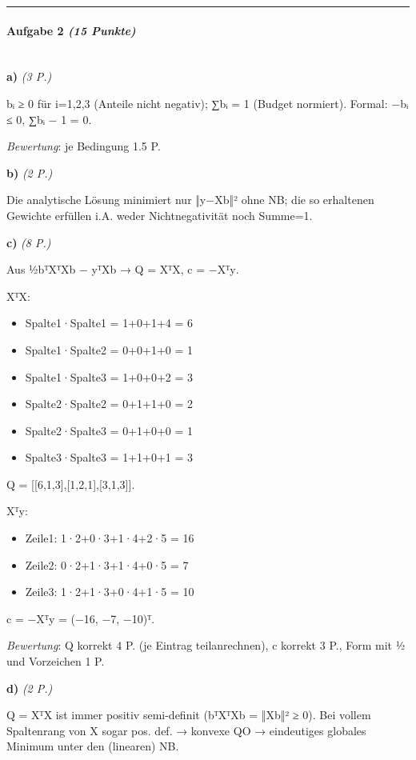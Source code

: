 \documentclass[11pt, a4paper]{article}
\begin{document}
\noindent\textcolor{rulegray}{\rule{\linewidth}{0.4pt}}


\paragraph{Aufgabe 2 \textit{(15 Punkte)}}\mbox{}\\[2pt]

\textbf{a)} \textit{(3 P.)}

bᵢ ≥ 0 für i=1,2,3 (Anteile nicht negativ); ∑bᵢ = 1 (Budget normiert). Formal: −bᵢ ≤ 0, ∑bᵢ − 1 = 0.

\textit{Bewertung}: je Bedingung 1.5 P.


\textbf{b)} \textit{(2 P.)}

Die analytische Lösung minimiert nur ‖y−Xb‖² ohne NB; die so erhaltenen Gewichte erfüllen i.A. weder Nichtnegativität noch Summe=1.


\textbf{c)} \textit{(8 P.)}

Aus ½b⃗ᵀXᵀXb⃗ − y⃗ᵀXb⃗ → Q = XᵀX, c⃗ = −Xᵀy⃗.


XᵀX:

\begin{itemize}
  \item Spalte1·Spalte1 = 1+0+1+4 = 6
  \item Spalte1·Spalte2 = 0+0+1+0 = 1
  \item Spalte1·Spalte3 = 1+0+0+2 = 3
  \item Spalte2·Spalte2 = 0+1+1+0 = 2
  \item Spalte2·Spalte3 = 0+1+0+0 = 1
  \item Spalte3·Spalte3 = 1+1+0+1 = 3
\end{itemize}

Q = [[6,1,3],[1,2,1],[3,1,3]].


Xᵀy⃗:

\begin{itemize}
  \item Zeile1: 1·2+0·3+1·4+2·5 = 16
  \item Zeile2: 0·2+1·3+1·4+0·5 = 7
  \item Zeile3: 1·2+1·3+0·4+1·5 = 10
\end{itemize}

c⃗ = −Xᵀy⃗ = (−16, −7, −10)ᵀ.


\textit{Bewertung}: Q korrekt 4 P. (je Eintrag teilanrechnen), c⃗ korrekt 3 P., Form mit ½ und Vorzeichen 1 P.


\textbf{d)} \textit{(2 P.)}

Q = XᵀX ist immer positiv semi-definit (b⃗ᵀXᵀXb⃗ = ‖Xb⃗‖² ≥ 0). Bei vollem Spaltenrang von X sogar pos. def. → konvexe QO → eindeutiges globales Minimum unter den (linearen) NB.
\end{document}
